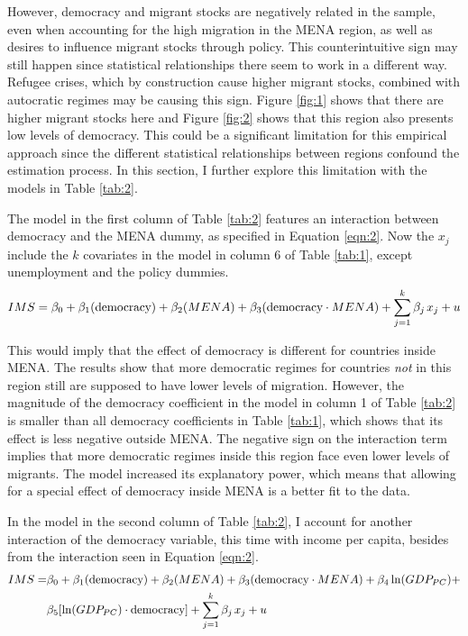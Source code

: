 \documentclass[../main.tex]{subfiles}
\begin{document}
However, democracy and migrant stocks are negatively related in the sample, even when accounting for the high migration in the MENA region, as well as desires to influence migrant stocks through policy. This counterintuitive sign may still happen since statistical relationships there seem to work in a different way. Refugee crises, which by construction cause higher migrant stocks, combined with autocratic regimes may be causing this sign. Figure \ref{fig:1} shows that there are higher migrant stocks here and Figure \ref{fig:2} shows that this region also presents low levels of democracy. This could be a significant limitation for this empirical approach since the different statistical relationships between regions confound the estimation process. In this section, I further explore this limitation with the models in Table \ref{tab:2}.

The model in the first column of Table \ref{tab:2} features an interaction between democracy and the MENA dummy, as specified in Equation \ref{eqn:2}. Now the $x_j$  include the $k$ covariates in the model in column 6 of Table \ref{tab:1}, except unemployment and the policy dummies.
\begin{equation}
IMS=\beta_0+\beta_1 (\text{democracy}) + \beta_2 (MENA)+ \beta_{3} (\text{democracy} \cdot MENA)+\sum_{j=1}^k \beta_j\hspace{0.05cm} x_j+u
    \label{eqn:2}
\end{equation}

This would imply that the effect of democracy is different for countries inside MENA. The results show that more democratic regimes for countries \textit{not} in this region still are supposed to have lower levels of migration.  However, the magnitude of the democracy coefficient in the model in column 1 of Table \ref{tab:2} is smaller than all democracy coefficients in Table \ref{tab:1}, which shows that its effect is less negative outside MENA. The negative sign on the interaction term implies that more democratic regimes inside this region face even lower levels of migrants. The model increased its explanatory power, which means that allowing for a special effect of democracy inside MENA is a better fit to the data. 

\clearpage
In the model in the second column of Table \ref{tab:2}, I account for another interaction of the democracy variable, this time with income per capita, besides from the interaction seen in Equation \ref{eqn:2}.
\begin{equation}
\begin{split} %
IMS=&\beta_0+\beta_1 (\text{democracy}) + \beta_2 (MENA)+ \beta_{3} (\text{democracy} \cdot MENA)+\beta_4 \ln (GDP_{PC}) + \\ 
     &\beta_5 [ \ln (GDP_{PC}) \cdot \text{democracy}]+\sum_{j=1}^k \beta_j\hspace{0.05cm} x_j+u 
     \end{split}
    \label{eqn:3}
\end{equation}
\end{document}
